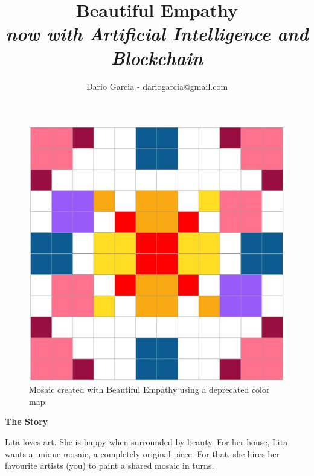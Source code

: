 \documentclass[twocolumn]{article}
\title{Beautiful Empathy\\
\textit{now with Artificial Intelligence and Blockchain}}
\author{Dario Garcia - dariogarcia@gmail.com}
\newcommand{\lvl}[1]{\vspace{0.5cm}\Large{\textbf{#1}}\vspace{0.2cm}}
\begin{document}
\maketitle

\lvl{}
\vspace{-1cm}




\begin{figure}[h!]
\centering
\includegraphics[scale=0.25]{First_ever.jpg}
\caption{Mosaic created with Beautiful Empathy using a deprecated color map.}
\label{fig:mosaic}
\end{figure}


\null
\vspace{1cm}
\lvl{The Story}

Lita loves art. She is happy when surrounded by beauty. For her house, Lita wants a unique mosaic, a completely original piece. For that, she hires her favourite artists (you) to paint a shared mosaic in turns.
\end{document}
